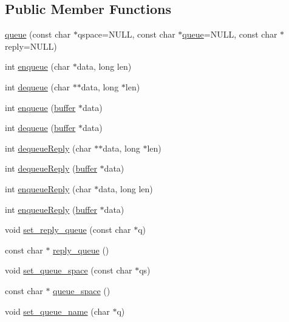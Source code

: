 \subsection*{Public Member Functions}
\begin{DoxyCompactItemize}
\item 
\hyperlink{classatmi_1_1queue_af8c86b01e410fe6499a7f53cdf70eb35}{queue} (const char $\ast$qspace=N\+U\+L\+L, const char $\ast$\hyperlink{classatmi_1_1queue}{queue}=N\+U\+L\+L, const char $\ast$reply=N\+U\+L\+L)
\item 
int \hyperlink{classatmi_1_1queue_a6b27337fd68ca97236e4905d09b7eb15}{enqueue} (char $\ast$data, long len)
\item 
int \hyperlink{classatmi_1_1queue_a140e0faa2ab1265d3258ebc5f2049c41}{dequeue} (char $\ast$$\ast$data, long $\ast$len)
\item 
int \hyperlink{classatmi_1_1queue_a47254fc660abe655dfabb330f30e3148}{enqueue} (\hyperlink{classatmi_1_1buffer}{buffer} $\ast$data)
\item 
int \hyperlink{classatmi_1_1queue_a05cd6e1603e44186f9c11a759c0c6683}{dequeue} (\hyperlink{classatmi_1_1buffer}{buffer} $\ast$data)
\item 
int \hyperlink{classatmi_1_1queue_aa8a60e7609a1c28ec346a898a80f8ea6}{dequeue\+Reply} (char $\ast$$\ast$data, long $\ast$len)
\item 
int \hyperlink{classatmi_1_1queue_a27eee7bbb943c9fae27ced1e20c5690a}{dequeue\+Reply} (\hyperlink{classatmi_1_1buffer}{buffer} $\ast$data)
\item 
int \hyperlink{classatmi_1_1queue_a2ea608bb1f59fdccb2b7592381bcf267}{enqueue\+Reply} (char $\ast$data, long len)
\item 
int \hyperlink{classatmi_1_1queue_abffed5f4f91dedd7e62a445444f8f94e}{enqueue\+Reply} (\hyperlink{classatmi_1_1buffer}{buffer} $\ast$data)
\item 
void \hyperlink{classatmi_1_1queue_a216acfef7e80352c8ce8476825f1146e}{set\+\_\+reply\+\_\+queue} (const char $\ast$q)
\item 
const char $\ast$ \hyperlink{classatmi_1_1queue_ac851146259feb3bf93aed287d6d42cb2}{reply\+\_\+queue} ()
\item 
void \hyperlink{classatmi_1_1queue_a9b8f29fbb2012dda53d6f799ad2110b4}{set\+\_\+queue\+\_\+space} (const char $\ast$qs)
\item 
const char $\ast$ \hyperlink{classatmi_1_1queue_aaf7d8d18008f9ee987b7e7aa2195d1db}{queue\+\_\+space} ()
\item 
void \hyperlink{classatmi_1_1queue_a5d70bbf99076bd41269e2a558bf52475}{set\+\_\+queue\+\_\+name} (char $\ast$q)

\end{DoxyCompactItemize}
